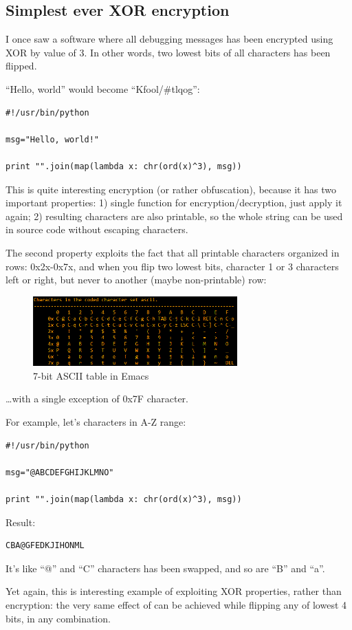 \subsection{Simplest ever XOR encryption}

I once saw a software where all debugging messages has been encrypted using XOR by value of 3.
In other words, two lowest bits of all characters has been flipped.

``Hello, world'' would become ``Kfool/\#tlqog'':

\begin{lstlisting}
#!/usr/bin/python

msg="Hello, world!"

print "".join(map(lambda x: chr(ord(x)^3), msg))
\end{lstlisting}

This is quite interesting encryption (or rather obfuscation), because it has two important properties:
1) single function for encryption/decryption, just apply it again;
2) resulting characters are also printable, so the whole string can be used in source code without escaping characters.

The second property exploits the fact that all printable characters organized in rows: 0x2x-0x7x, and when you 
flip two lowest bits, character  1 or 3 characters left or right, but never  to another (maybe
non-printable) row:

\begin{figure}[H]
\centering
\includegraphics[width=0.7\textwidth]{ascii_clean.png}
\caption{7-bit \ac{ASCII} table in Emacs}
\end{figure}

\dots with a single exception of 0x7F character.

For example, let's  characters in A-Z range:

\begin{lstlisting}
#!/usr/bin/python

msg="@ABCDEFGHIJKLMNO"

print "".join(map(lambda x: chr(ord(x)^3), msg))
\end{lstlisting}

Result:
\begin{lstlisting}
CBA@GFEDKJIHONML
\end{lstlisting}

It's like ``@'' and ``C'' characters has been swapped, and so are ``B'' and ``a''.

Yet again, this is interesting example of exploiting XOR properties, rather than encryption:
the very same effect of  can be achieved while flipping any of lowest 4 bits,
in any combination.

